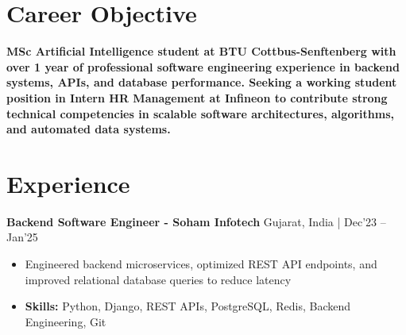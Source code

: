 \documentclass[a4paper,11pt]{article}
\begin{document}
\vspace{-7mm}

\section{\textbf{Career Objective}}
\vspace{1mm}

\textbf{MSc Artificial Intelligence student at BTU Cottbus-Senftenberg with over 1 year of professional software engineering experience in backend systems, APIs, and database performance. Seeking a working student position in Intern HR Management at Infineon to contribute strong technical competencies in scalable software architectures, algorithms, and automated data systems.}
\section{\textbf{Experience}}


\vspace{1mm}
  \textbf{Backend Software Engineer - Soham Infotech} \hfill Gujarat, India | Dec'23 -- Jan'25
\vspace{-1.5mm} %
\begin{itemize}
  \item Engineered backend microservices, optimized REST API endpoints, and improved relational database queries to reduce latency


\vspace{-2mm}
  \item \textbf{Skills:} Python, Django, REST APIs, PostgreSQL, Redis, Backend Engineering, Git
\end{itemize}
\end{document}
